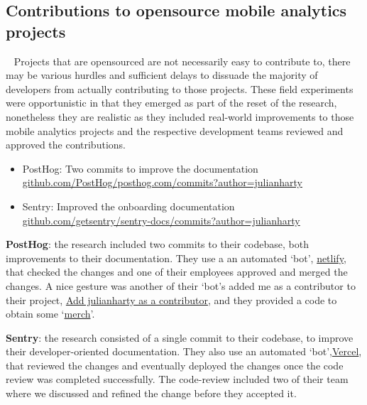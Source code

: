 \subsection{Contributions to opensource mobile analytics projects}~\label{section-contributions-to-opensource-mobile-analytics-projects}
Projects that are opensourced are not necessarily easy to contribute to, there may be various hurdles and sufficient delays to dissuade the majority of developers from actually contributing to those projects. These field experiments were opportunistic in that they emerged as part of the reset of the research, nonetheless they are realistic as they included real-world improvements to those mobile analytics projects and the respective development teams reviewed and approved the contributions.

\begin{itemize}
    \itemsep0em
    \item PostHog: Two commits to improve the documentation \\ \href{https://github.com/PostHog/posthog.com/commits?author=julianharty}{github.com/PostHog/posthog.com/commits?author=julianharty}
    \item Sentry: Improved the onboarding documentation \\ \href{https://github.com/getsentry/sentry-docs/commits?author=julianharty}{github.com/getsentry/sentry-docs/commits?author=julianharty}
\end{itemize}

\textbf{PostHog}: the research included two commits to their codebase, both improvements to their documentation. They use a an automated `bot', \href{https://www.netlify.com/}{netlify}, that checked the changes and one of their employees approved and merged the changes. A nice gesture was another of their `bot's added me as a contributor to their project, \href{https://github.com/PostHog/posthog/pull/5692}{Add julianharty as a contributor}, and they provided a code to obtain some `\href{https://www.dictionary.com/browse/merch}{merch}'.

\textbf{Sentry}: the research consisted of a single commit to their codebase, to improve their developer-oriented documentation. They also use an automated `bot',\href{https://vercel.com/docs/concepts/git/vercel-for-github}{Vercel}, that reviewed the changes and eventually deployed the changes once the code review was completed successfully. The code-review included two of their team where we discussed and refined the change before they accepted it.

